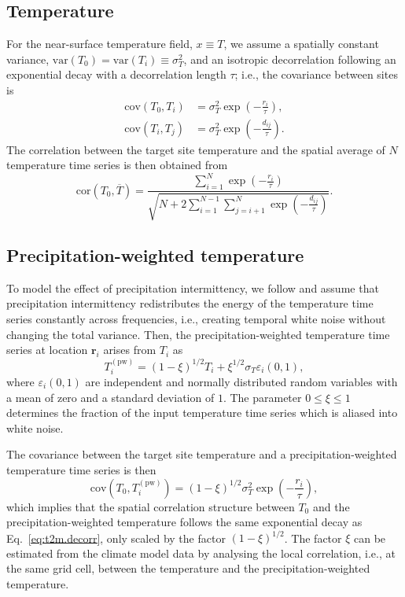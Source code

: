 \documentclass[cp, manuscript]{copernicus}
\begin{document}
\subsection{Temperature}
\label{app:concept.model.t2m}

For the near-surface temperature field, $x \equiv T$, we assume a spatially
constant variance, $\mathrm{var}(T_0)=\mathrm{var}(T_i)\equiv\sigma_T^2$, and an
isotropic decorrelation following an exponential decay with a decorrelation
length $\tau$; i.e., the covariance between sites is
%
\begin{align}
\label{eq:t2m.decorr}
\mathrm{cov}(T_0,T_i)&=\sigma_T^2\exp{\left(-\frac{r_i}{\tau}\right)},\\
\mathrm{cov}(T_i,T_j)&=\sigma_T^2\exp{\left(-\frac{d_{ij}}{\tau}\right)}.
\end{align}
%
The correlation between the target site temperature and the spatial average of
$N$ temperature time series is then obtained from
%
\begin{equation}
\label{eq:t2m.corr}
\mathrm{cor}(T_0,\overline{T})=
\frac{\sum_{i=1}^{N}\exp{\left(-\frac{r_i}{\tau}\right)}}
{\sqrt{N+2\sum_{i=1}^{N-1}
\sum_{j=i+1}^{N}{\exp{\left(-\frac{d_{ij}}{\tau}\right)}}}}.
\end{equation}

\subsection{Precipitation-weighted temperature}
\label{app:concept.model.t2m.pw}

To model the effect of precipitation intermittency, we follow
\citet{Laepple2018} and assume that precipitation intermittency redistributes
the energy of the temperature time series constantly across frequencies,
i.e., creating temporal white noise without changing the total variance. Then,
the precipitation-weighted temperature time series at location $\mathbf{r}_i$
arises from $T_i$ as
%
\begin{equation}
\label{eq:precip.weighting}
T_i^{\mathrm{(pw)}}=
\left(1-\xi\right)^{1/2}T_i + \xi^{1/2} \sigma_T \varepsilon_i(0,1),
\end{equation}
%
where $\varepsilon_i(0,1)$ are independent and normally distributed random
variables with a mean of zero and a standard deviation of $1$. The parameter
$0\leq\xi\leq1$ determines the fraction of the input temperature time series
which is aliased into white noise.

The covariance between the target site temperature and a precipitation-weighted
temperature time series is then
\begin{equation}
\label{eq:t2m.pw.decorr}
\mathrm{cov}(T_0,T_i^{\mathrm{(pw)}})=
(1-\xi)^{1/2}\sigma_T^2\exp{\left(-\frac{r_i}{\tau}\right)},
\end{equation}
%
which implies that the spatial correlation structure between $T_0$ and the
precipitation-weighted temperature follows the same exponential decay as
Eq.~\eqref{eq:t2m.decorr}, only scaled by the factor $(1-\xi)^{1/2}$. The factor
$\xi$ can be estimated from the climate model data by analysing the local
correlation, i.e., at the same grid cell, between the temperature and the
precipitation-weighted temperature.
\end{document}
